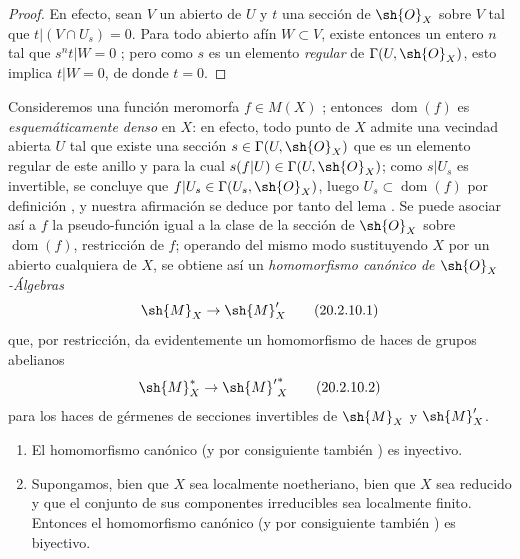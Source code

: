 \begin{proof}
En efecto, sean $V$ un abierto de $U$ y $t$ una sección de $\sh{O}_X$ sobre $V$ tal que $t|(V\cap U_s)=0$.
Para todo abierto afín $W\subset V$, existe entonces un entero $n$ tal que $s^nt|W=0$ ; pero como $s$ es un elemento \emph{regular} de $\Gamma(U,\sh{O}_X)$, esto implica $t|W=0$, de donde $t=0$.
\end{proof}

\begin{env}[20.2.10]
\label{IV.20.2.10}
Consideremos una función meromorfa $f\in M(X)$ ; entonces $\operatorname{dom}(f)$ es \emph{esquemáticamente denso} en $X$: en efecto, todo punto de $X$ admite una vecindad abierta $U$ tal que existe una sección $s\in\Gamma(U,\sh{O}_X)$ que es un elemento regular de este anillo y para la cual $s(f|U)\in\Gamma(U,\sh{O}_X)$; como $s|U_s$ es invertible, se concluye que $f|U_s\in\Gamma(U_s,\sh{O}_X)$, luego $U_s\subset\operatorname{dom}(f)$ por definición , y nuestra afirmación se deduce por tanto del lema .
Se puede asociar así a $f$ la pseudo-función igual a la clase de la sección de $\sh{O}_X$ sobre $\operatorname{dom}(f)$, restricción de $f$; operando del mismo modo sustituyendo $X$ por un abierto cualquiera de $X$, se obtiene así un \emph{homomorfismo canónico de $\sh{O}_X$-Álgebras}
\[
\label{IV.20.2.10.1}
  \sh{M}_X\to\sh{M}'_X
  \tag{20.2.10.1}
\]
que, por restricción, da evidentemente un homomorfismo de haces de grupos abelianos
\[
\label{IV.20.2.10.2}
  \sh{M}_X^*\to{\sh{M}'}^*_X
  \tag{20.2.10.2}
\]
para los haces de gérmenes de secciones invertibles de $\sh{M}_X$ y $\sh{M}'_X$.
\end{env}

\begin{proposition}[20.2.11]
\label{IV.20.2.11}
\medskip
\begin{enumerate}[label=\emph{(\roman*)}]
  \item El homomorfismo canónico \emph{} \textup{(y por consiguiente también \emph{})} es inyectivo.
  \item Supongamos, bien que $X$ sea localmente noetheriano, bien que $X$ sea reducido y que el conjunto de sus componentes irreducibles sea localmente finito.
  Entonces el homomorfismo canónico \emph{} \textup{(y por consiguiente también \emph{})} es biyectivo.
\end{enumerate}
\end{proposition}

